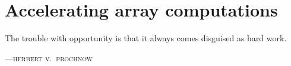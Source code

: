 
\chapter{Accelerating array computations}
\label{ch:implementation}
\epigraph{The trouble with opportunity is that it always comes disguised as hard work.}%
{\textsc{---herbert v.\ prochnow}}


%
%
%

